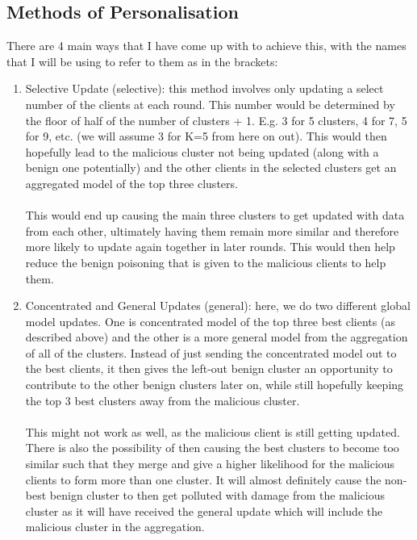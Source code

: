 \subsection{Methods of Personalisation}
There are 4 main ways that I have come up with to achieve this, with the names that I will be using to refer to them as in the brackets:
\begin{enumerate}
    \item Selective Update (selective): this method involves only updating a select number of the clients at each round. This number would be determined by the floor of half of the number of clusters + 1. E.g. 3 for 5 clusters, 4 for 7, 5 for 9, etc. (we will assume 3 for K=5 from here on out).
    This would then hopefully lead to the malicious cluster not being updated (along with a benign one potentially) and the other clients in the selected clusters get an aggregated model of the top three clusters.
    \\ \\
    This would end up causing the main three clusters to get updated with data from each other, ultimately having them remain more similar and therefore more likely to update again together in later rounds.
    This would then help reduce the benign poisoning that is given to the malicious clients to help them.
    
    \item Concentrated and General Updates (general): here, we do two different global model updates.
    One is concentrated model of the top three best clients (as described above) and the other is a more general model from the aggregation of all of the clusters.
    Instead of just sending the concentrated model out to the best clients, it then gives the left-out benign cluster an opportunity to contribute to the other benign clusters later on, while still hopefully keeping the top 3 best clusters away from the malicious cluster.
    \\ \\
    This might not work as well, as the malicious client is still getting updated.
    There is also the possibility of then causing the best clusters to become too similar such that they merge and give a higher likelihood for the malicious clients to form more than one cluster.
    It will almost definitely cause the non-best benign cluster to then get polluted with damage from the malicious cluster as it will have received the general update which will include the malicious cluster in the aggregation.
    

\end{enumerate}
